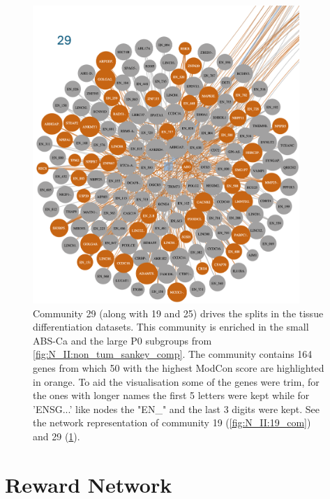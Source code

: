 \begin{figure}[!htb]    
    \centering
    \includegraphics[width=0.9\textwidth,keepaspectratio]{Sections/Network_II/resources/non_tum/29_com.png}
    \caption[Community 29 - driving the healthy and tumour splits]{Community 29 (along with 19 and 25) drives the splits in the tissue differentiation datasets. This community is enriched in the small ABS-Ca and the large P0 subgroups from \cref{fig:N_II:non_tum_sankey_comp}. The community contains 164 genes from which 50 with the highest ModCon score are highlighted in orange. To aid the visualisation some of the genes were trim, for the ones with longer names the first 5 letters were kept while for 'ENSG...' like nodes the "EN\_" and the last 3 digits were kept.  See the network representation of community 19 (\cref{fig:N_II:19_com}) and 29 (\cref{fig:ap:com_29}).}
    \label{fig:ap:com_29}
\end{figure}



\section{Reward Network}

